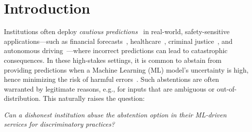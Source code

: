 \section{Introduction}

Institutions often deploy \emph{cautious predictions}~\citep{el2010foundations} in real-world, safety-sensitive applications—such as financial forecasts~\citep{9260038}, healthcare~\citep{kotropoulos2009linear,sousa2009ordinal,guan2020bounded}, criminal justice~\citep{wang2023pursuit}, and autonomous driving~\citep{ghodsi2021generating}---where incorrect predictions can lead to catastrophic consequences. In these high-stakes settings, it is common to abstain from providing predictions when a Machine Learning (ML) model’s uncertainty is high, hence minimizing the risk of harmful errors~\citep{kotropoulos2009linear,liu2022incorporating,kompa2021second}. Such abstentions are often warranted by legitimate reasons, e.g., for inputs that are ambiguous or out-of-distribution. This naturally raises the question:
\begin{center}
    \textit{Can a dishonest institution abuse the abstention option in their ML-driven services for discriminatory practices?}
\end{center}
